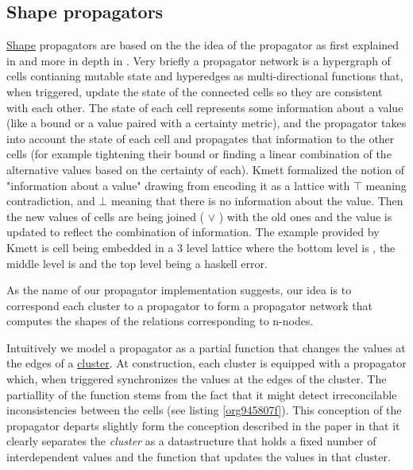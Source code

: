 \subsection{Shape propagators}
\label{sec:org089acdd}

\hyperref[sec:org17d410b]{Shape} propagators are based on the the idea
of the propagator as first explained in
\cite{sussmanArtPropagator2009} and more in depth in
\cite{hansonSoftwareDesignFlexibility2021a}. Very briefly a propagator
network is a hypergraph of cells contianing mutable state and
hyperedges as multi-directional functions that, when triggered, update
the state of the connected cells so they are consistent with each
other. The state of each cell represents some information about a
value (like a bound or a value paired with a certainty metric), and
the propagator takes into account the state of each cell and
propagates that information to the other cells (for example tightening
their bound or finding a linear combination of the alternative values
based on the certainty of each). Kmett \cite{kmettPropagators2021}
formalized the notion of "information about a value" drawing from
\cite{kuperLVarsLatticebasedData2013} encoding it as a lattice with
\(\top\) meaning contradiction, and \(\bot\) meaning that there is no
information about the value. Then the new values of cells are being
joined ( \(\lor\) ) with the old ones and the value is updated to
reflect the combination of information. The example provided by Kmett
is cell being embedded in a 3 level lattice where the bottom level is
, the middle level is  and the top
level being a haskell error.

As the name of our propagator implementation suggests, our idea is to
correspond each cluster to a propagator to form a propagator network
that computes the shapes of the relations corresponding to n-nodes.

Intuitively we model a propagator as a partial function that changes
the values at the edges of a \hyperref[sec:org6e4b098]{cluster}. At
construction, each cluster is equipped with a propagator which, when
triggered synchronizes the values at the edges of the cluster. The
partiallity of the function stems from the fact that it might detect
irreconcilable inconsistencies between the cells (see listing
\ref{org945807f}). This conception of the propagator departs slightly
form the conception described in the paper in that it clearly
separates the \emph{cluster} as a datastructure that holds a fixed
number of interdependent values and the function that updates the
values in that cluster.

